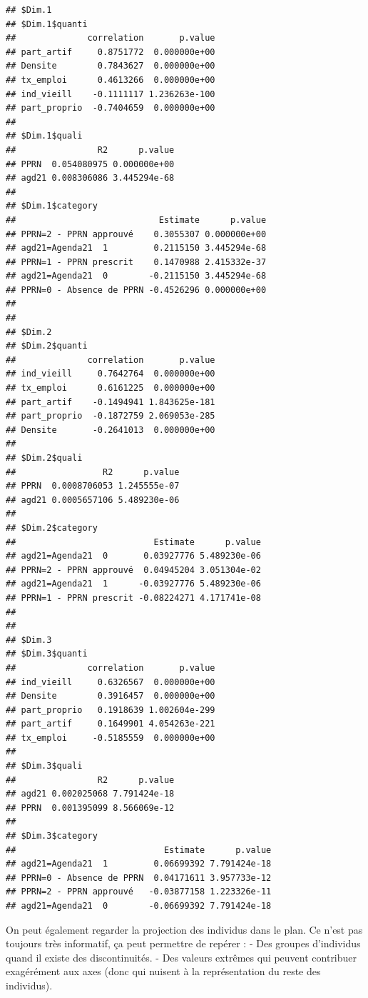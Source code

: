 \documentclass[]{book}
\begin{document}
\begin{verbatim}
## $Dim.1
## $Dim.1$quanti
##              correlation       p.value
## part_artif     0.8751772  0.000000e+00
## Densite        0.7843627  0.000000e+00
## tx_emploi      0.4613266  0.000000e+00
## ind_vieill    -0.1111117 1.236263e-100
## part_proprio  -0.7404659  0.000000e+00
## 
## $Dim.1$quali
##                R2      p.value
## PPRN  0.054080975 0.000000e+00
## agd21 0.008306086 3.445294e-68
## 
## $Dim.1$category
##                            Estimate      p.value
## PPRN=2 - PPRN approuvé    0.3055307 0.000000e+00
## agd21=Agenda21  1         0.2115150 3.445294e-68
## PPRN=1 - PPRN prescrit    0.1470988 2.415332e-37
## agd21=Agenda21  0        -0.2115150 3.445294e-68
## PPRN=0 - Absence de PPRN -0.4526296 0.000000e+00
## 
## 
## $Dim.2
## $Dim.2$quanti
##              correlation       p.value
## ind_vieill     0.7642764  0.000000e+00
## tx_emploi      0.6161225  0.000000e+00
## part_artif    -0.1494941 1.843625e-181
## part_proprio  -0.1872759 2.069053e-285
## Densite       -0.2641013  0.000000e+00
## 
## $Dim.2$quali
##                 R2      p.value
## PPRN  0.0008706053 1.245555e-07
## agd21 0.0005657106 5.489230e-06
## 
## $Dim.2$category
##                           Estimate      p.value
## agd21=Agenda21  0       0.03927776 5.489230e-06
## PPRN=2 - PPRN approuvé  0.04945204 3.051304e-02
## agd21=Agenda21  1      -0.03927776 5.489230e-06
## PPRN=1 - PPRN prescrit -0.08224271 4.171741e-08
## 
## 
## $Dim.3
## $Dim.3$quanti
##              correlation       p.value
## ind_vieill     0.6326567  0.000000e+00
## Densite        0.3916457  0.000000e+00
## part_proprio   0.1918639 1.002604e-299
## part_artif     0.1649901 4.054263e-221
## tx_emploi     -0.5185559  0.000000e+00
## 
## $Dim.3$quali
##                R2      p.value
## agd21 0.002025068 7.791424e-18
## PPRN  0.001395099 8.566069e-12
## 
## $Dim.3$category
##                             Estimate      p.value
## agd21=Agenda21  1         0.06699392 7.791424e-18
## PPRN=0 - Absence de PPRN  0.04171611 3.957733e-12
## PPRN=2 - PPRN approuvé   -0.03877158 1.223326e-11
## agd21=Agenda21  0        -0.06699392 7.791424e-18
\end{verbatim}

On peut également regarder la projection des individus dans le plan. Ce n'est pas toujours très informatif, ça peut permettre de repérer :
- Des groupes d'individus quand il existe des discontinuités.
- Des valeurs extrêmes qui peuvent contribuer exagérément aux axes (donc qui nuisent à la représentation du reste des individus).
\end{document}
